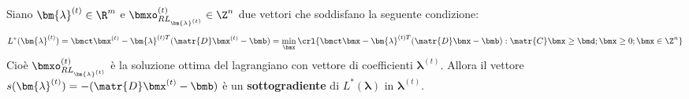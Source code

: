 \documentclass[\main/main.tex]{subfiles}
\begin{document}
\begin{theorem}
    Siano \(\bm{\lambda}^{(t)} \in \R^m\) e \(\bmxo_{RL_{\bm{\lambda}^{(t)}}}^{(t)} \in \Z^n\) due vettori che soddisfano la seguente condizione:
    \[
        L^*(\bm{\lambda}^{(t)})=\bmct\bmx^{(t)} - \bm{\lambda}^{(t)T}(\matr{D}\bmx^{(t)}-\bmb) = \min_{\bmx}\crl{\bmct\bmx-\bm{\lambda}^{(t)T}(\matr{D}\bmx-\bmb): \matr{C}\bmx \geq \bmd; \bmx \geq 0; \bmx \in \Z^n}
    \]    Cioè \(\bmxo^{(t)}_{RL_{\bm{\lambda}^{(t)}}}\) è la soluzione ottima del lagrangiano con vettore di coefficienti \(\bm{\lambda}^{(t)}\). Allora il vettore \(s(\bm{\lambda}^{(t)}) = - (\matr{D}\bmx^{(t)}-\bmb)\) è un \textbf{sottogradiente} di \(L^*(\bm{\lambda})\) in \(\bm{\lambda}^{(t)}\).
\end{theorem}
\end{document}
